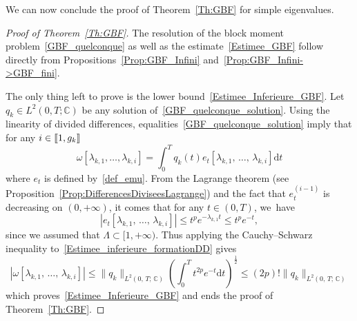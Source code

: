 \documentclass[10pt]{amsart}
\theoremstyle{definition}\newtheorem{defi}[theo]{Definition}\newtheorem{rema}[theo]{Remark}\newtheorem{exam}[theo]{Example}\newtheorem{exem}[theo]{Example}\newtheorem{nota}[theo]{Notation}
\newcommand{\llbracket}{\mathopen{[\mkern -2.7mu[}}
\newcommand{\rrbracket}{\mathclose{]\mkern -2.7mu]}}
\newcommand{\inter}[2]{\llbracket #1,#2 \rrbracket}
\newcommand{\n}{g}
\newcommand{\C}{\mathbb{C}}
\newcommand{\md}{\mathrm{d}}
\begin{document}
We can now conclude the proof of Theorem~\ref{Th:GBF} for simple eigenvalues.
\begin{proof}[Proof of Theorem~\ref{Th:GBF}]
The resolution of the block moment problem~\eqref{GBF_quelconque} as well as the estimate~\eqref{Estimee_GBF} follow directly from Propositions~\ref{Prop:GBF_Infini} and~\ref{Prop:GBF_Infini->GBF_fini}.

The only thing left to prove is the lower bound~\eqref{Estimee_Inferieure_GBF}. Let $q_k \in L^2(0,T;\C)$ be any solution of~\eqref{GBF_quelconque_solution}. Using the linearity of divided differences, equalities~\eqref{GBF_quelconque_solution} imply that for any $i \in \inter{1}{\n_k}$
\begin{equation}\label{Estimee_inferieure_formationDD}
\omega[\lambda_{k,1}, \dots, \lambda_{k,i}] = \int_0^T q_k(t) e_t[\lambda_{k,1},\,\dots,\, \lambda_{k,i}] \md t
\end{equation}
where $e_t$ is defined by~\eqref{def_emu}. From the Lagrange theorem (see Proposition~\ref{Prop:DifferencesDiviseesLagrange}) and the fact that $e_t^{(i-1)}$ is decreasing on $(0,+\infty)$, it comes that for any $t \in (0,T)$, we~have
\[
\left| e_t[\lambda_{k,1},\,\dots,\, \lambda_{k,i}] \right|\leq t^p e^{-\lambda_{k,1} t} \leq t^p e^{-t},
\]
since we assumed that $\Lambda\subset [1,+\infty)$. Thus applying the Cauchy--Schwarz inequality to~\eqref{Estimee_inferieure_formationDD} gives
\[
\left| \omega[\lambda_{k,1},\,\dots,\, \lambda_{k,i}] \right| \leq \| q_k \|_{L^2(0,\,T;\,\C)} \left(\int_0^T t^{2p} e^{-t} \md t\right)^{\frac{1}{2}} \leq (2p)! \| q_k \|_{L^2(0,\,T;\,\C)}
\]
which proves~\eqref{Estimee_Inferieure_GBF} and ends the proof of Theorem~\ref{Th:GBF}.
\end{proof}
\end{document}
